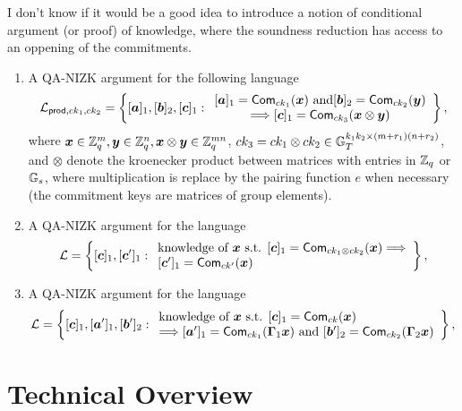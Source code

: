\begin{enumerate}
{\color{red} I don't know if it would be a good idea to introduce a notion of conditional argument (or proof) of knowledge, where the soundness reduction has access to an oppening of the commitments.}
\begin{enumerate}
\item A QA-NIZK argument for the following language
$$
\mathcal{L}_{\mathsf{prod},ck_1,ck_2}=\left\{[{\boldsymbol{a}}]_1,[{\boldsymbol{b}}]_2,[{\boldsymbol{c}}]_1:
	\begin{array}{c}
		[{\boldsymbol{a}}]_1=\mathsf{Com}_{ck_1}({\boldsymbol{x}})\text{ and}
		{[{\boldsymbol{b}}]_2=\mathsf{Com}_{ck_2}({\boldsymbol{y}})}\\
		\Longrightarrow
		[{\boldsymbol{c}}]_1=\mathsf{Com}_{ck_3}({\boldsymbol{x}}\otimes{\boldsymbol{y}})
	\end{array}\right\},
$$
where ${\boldsymbol{x}}\in\mathbb{Z}_q^m,{\boldsymbol{y}}\in\mathbb{Z}_q^n,{\boldsymbol{x}}\otimes{\boldsymbol{y}}\in\mathbb{Z}_q^{mn}$, $ck_3=ck_1\otimes ck_2\in\mathbb{G}_T^{k_1k_2\times(m+r_1)(n+r_2)}$, and $\otimes$ denote the kroenecker product between matrices with entries in $\mathbb{Z}_q$ or $\mathbb{G}_s$, where multiplication is replace by the pairing function $e$ when necessary (the commitment keys are matrices of group elements).
\item A QA-NIZK argument for the language
$$
\mathcal{L} = \left\{[{\boldsymbol{c}}]_1,[{\boldsymbol{c}}']_1:
	\begin{array}{l} \text{knowledge of } {\boldsymbol{x}} \text{ s.t. }
		{[{\boldsymbol{c}}]_1=\mathsf{Com}_{ck_1\otimes ck_2}({\boldsymbol{x}})}
		\Longrightarrow\\
		{[{\boldsymbol{c}}']_1=\mathsf{Com}_{ck'}({\boldsymbol{x}})}
	\end{array}\right\},
$$
\item A QA-NIZK argument for the language
$$
\mathcal{L} = \left\{[{\boldsymbol{c}}]_1,[{\boldsymbol{a}}']_1,[{\boldsymbol{b}}']_2:
	\begin{array}{l}
		\text{knowledge of } {\boldsymbol{x}} \text{ s.t. }[{\boldsymbol{c}}]_1=\mathsf{Com}_{ck}({\boldsymbol{x}})\\
		\Longrightarrow
		[{\boldsymbol{a}}']_1=\mathsf{Com}_{ck_1}(\mathbf{{\Gamma}}_1{\boldsymbol{x}})\text{ and }
		[{\boldsymbol{b}}']_2=\mathsf{Com}_{ck_2}(\mathbf{{\Gamma}}_2{\boldsymbol{x}})
	\end{array}\right\},
$$
\end{enumerate}
\end{enumerate}

\section{Technical Overview}

